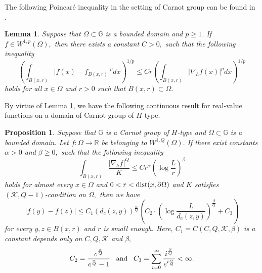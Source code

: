 \documentclass[11pt,twoside]{article}
\newtheorem{lem}[thm]{Lemma}
\newtheorem{prop}[thm]{Proposition}
\theoremstyle{definition}
\theoremstyle{remark}
\newcommand{\abs}[1]{\left|#1\right|}
\begin{document}
The following Poincar\'{e} inequality in the setting of Carnot group can be found in \cite{Bas14, DGP09, GN96, HK00, Jer86, Lu92}.
\begin{lem}\label{-11}
Suppose that $\Omega\subset\mathbb{G}$ is a bounded domain and $p\geq1$. If $f\in W^{1,p}(\Omega),$ then there exists a constant $C>0,$ such that the following inequality
\begin{equation}\label{0311888888000}
\left(\int_{B(x,r)}\vert f(x)-f_{B(x,r)}\vert^{p}dx\right)^{1/ p}\leq Cr\left(\int_{B(x,r)}\vert \nabla_{h}f(x)\vert^{p}dx\right)^{1/p}
\end{equation}
holds for all $x\in\Omega$ and $r>0$ such that $B(x,r)\subset\Omega.$
\end{lem}
By virtue of Lemma \ref{-11}, we have the following continuous result for real-value functions on a domain of Carnot group of $H$-type.
\begin{prop}\label{09888888111}
Suppose that $\mathbb{G}$ is a Carnot group of $H$-type and $\Omega\subset\mathbb{G}$ is a bounded domain. Let $f:\Omega\rightarrow\mathbb{R}$ be belonging to $W^{1,Q}(\Omega).$ If there exist constants $\alpha>0$ and $\beta\geq0,$ such that the following inequality 
\begin{equation}\label{09}
\int_{B(x,r)}\frac{\abs{ \nabla_{h}f}^{Q}}{K}\leq C r^{\alpha}\left(\log\frac{L}{r}\right)^{\beta}
\end{equation}
holds for almost every $x\in\Omega$ and $0<r<{\rm dist}(x,\partial\Omega)$ and $K$ satisfies  $(\mathcal{K}, Q-1)$-condition on $\Omega,$ then we have
\begin{equation}\label{90oiiiii}
\vert f(y)-f(z)\vert\leq C_{1}(d_{c}(z,y))^{\frac{\alpha}{Q}}\left(C_{2}\cdot\left(\log\frac{L}{d_{c}(z,y)}\right)^{\frac{\beta}{Q}}+C_{3}\right)
\end{equation}
for every $y,z\in B(x,r)$ and $r$ is small enough. Here, $C_{1}=C(C,Q,\mathcal{K},\beta)$ is a constant depends only on $C, Q,\mathcal{K}$ and $\beta,$ 
 $$C_{2}=\frac{e^{\frac{\alpha}{Q}}}{e^{\frac{\alpha}{Q}}-1}\;\;\; {\rm and} \;\;\;C_{3}=\sum_{i=0}^{\infty}\frac{i^{\frac{\beta}{Q}}}{e^{i\frac{\alpha}{Q}}}<\infty.$$
\end{prop}
\end{document}

